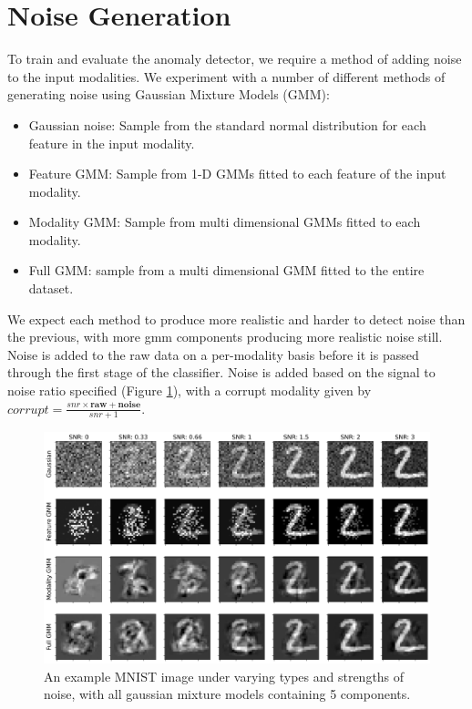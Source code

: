 \section{Noise Generation}
To train and evaluate the anomaly detector, we require a method of adding noise to the input modalities. We experiment with a number of different methods of generating noise using Gaussian Mixture Models (GMM):
\begin{itemize}
    \item Gaussian noise: Sample from the standard normal distribution for each feature in the input modality.
    \item Feature GMM: Sample from 1-D GMMs fitted to each feature of the input modality.
    \item Modality GMM: Sample from multi dimensional GMMs fitted to each modality.
    \item Full GMM: sample from a multi dimensional GMM fitted to the entire dataset.
\end{itemize}
We expect each method to produce more realistic and harder to detect noise than the previous, with more gmm components producing more realistic noise still. Noise is added to the raw data on a per-modality basis before it is passed through the first stage of the classifier. Noise is added based on the signal to noise ratio specified (Figure \ref{fig:noise}), with a corrupt modality given by $corrupt = \frac{snr\times \mathbf{raw} + \mathbf{noise}}{snr + 1}$.

\begin{figure}[H]
    \centering\captionsetup{width=.8\linewidth}
    \includegraphics[width=.9\textwidth]{images/noise.png}
    \caption{An example MNIST image under varying types and strengths of noise, with all gaussian mixture models containing 5 components.}
    \label{fig:noise}
\end{figure}

